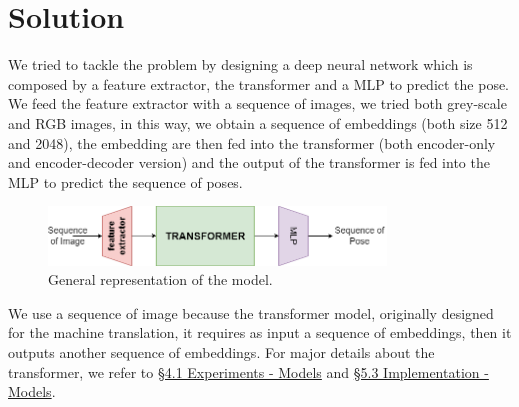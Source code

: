 
\section{Solution}\label{sec:solution}

We tried to tackle the problem by designing a deep neural network which is composed by a feature extractor, the transformer and a MLP to predict the pose.
We feed the feature extractor with a sequence of images, we tried both grey-scale and RGB images, in this way, we obtain a sequence of embeddings (both size 512 and 2048), the embedding are then fed into the transformer (both encoder-only and encoder-decoder version) and the output of the transformer is fed into the MLP to predict the sequence of poses.

\begin{figure}[H]
    \centering
    \includegraphics[width=0.8\textwidth]{images/1_4_general_solution}
    \caption{General representation of the model.}
    \label{fig:figure-1_4_solution}
\end{figure}

We use a sequence of image because the transformer model, originally designed for the machine translation, it requires as input a sequence of embeddings, then it outputs another sequence of embeddings.
For major details about the transformer, we refer to \hyperref[sec:exp-models]{\S4.1 Experiments - Models} and \hyperref[sec:models]{\S5.3 Implementation - Models}.